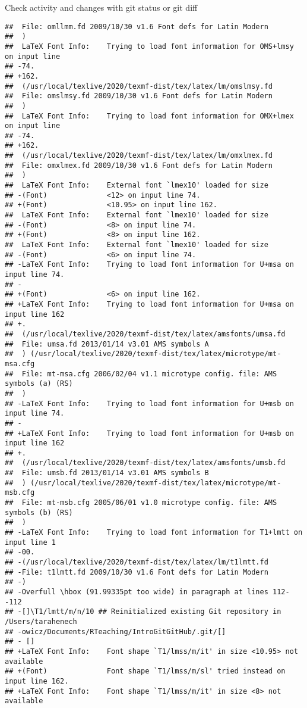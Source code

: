 \documentclass[ignorenonframetext,]{beamer}
\begin{document}
\begin{frame}[fragile]{Check activity and changes with git status or git
diff}
\begin{verbatim}
##  File: omllmm.fd 2009/10/30 v1.6 Font defs for Latin Modern
##  )
##  LaTeX Font Info:    Trying to load font information for OMS+lmsy on input line 
## -74.
## +162.
##  (/usr/local/texlive/2020/texmf-dist/tex/latex/lm/omslmsy.fd
##  File: omslmsy.fd 2009/10/30 v1.6 Font defs for Latin Modern
##  )
##  LaTeX Font Info:    Trying to load font information for OMX+lmex on input line 
## -74.
## +162.
##  (/usr/local/texlive/2020/texmf-dist/tex/latex/lm/omxlmex.fd
##  File: omxlmex.fd 2009/10/30 v1.6 Font defs for Latin Modern
##  )
##  LaTeX Font Info:    External font `lmex10' loaded for size
## -(Font)              <12> on input line 74.
## +(Font)              <10.95> on input line 162.
##  LaTeX Font Info:    External font `lmex10' loaded for size
## -(Font)              <8> on input line 74.
## +(Font)              <8> on input line 162.
##  LaTeX Font Info:    External font `lmex10' loaded for size
## -(Font)              <6> on input line 74.
## -LaTeX Font Info:    Trying to load font information for U+msa on input line 74.
## -
## +(Font)              <6> on input line 162.
## +LaTeX Font Info:    Trying to load font information for U+msa on input line 162
## +.
##  (/usr/local/texlive/2020/texmf-dist/tex/latex/amsfonts/umsa.fd
##  File: umsa.fd 2013/01/14 v3.01 AMS symbols A
##  ) (/usr/local/texlive/2020/texmf-dist/tex/latex/microtype/mt-msa.cfg
##  File: mt-msa.cfg 2006/02/04 v1.1 microtype config. file: AMS symbols (a) (RS)
##  )
## -LaTeX Font Info:    Trying to load font information for U+msb on input line 74.
## -
## +LaTeX Font Info:    Trying to load font information for U+msb on input line 162
## +.
##  (/usr/local/texlive/2020/texmf-dist/tex/latex/amsfonts/umsb.fd
##  File: umsb.fd 2013/01/14 v3.01 AMS symbols B
##  ) (/usr/local/texlive/2020/texmf-dist/tex/latex/microtype/mt-msb.cfg
##  File: mt-msb.cfg 2005/06/01 v1.0 microtype config. file: AMS symbols (b) (RS)
##  )
## -LaTeX Font Info:    Trying to load font information for T1+lmtt on input line 1
## -00.
## -(/usr/local/texlive/2020/texmf-dist/tex/latex/lm/t1lmtt.fd
## -File: t1lmtt.fd 2009/10/30 v1.6 Font defs for Latin Modern
## -)
## -Overfull \hbox (91.99335pt too wide) in paragraph at lines 112--112
## -[]\T1/lmtt/m/n/10 ## Reinitialized existing Git repository in /Users/tarahenech
## -owicz/Documents/RTeaching/IntroGitGitHub/.git/[] 
## - []
## +LaTeX Font Info:    Font shape `T1/lmss/m/it' in size <10.95> not available
## +(Font)              Font shape `T1/lmss/m/sl' tried instead on input line 162.
## +LaTeX Font Info:    Font shape `T1/lmss/m/it' in size <8> not available

\end{verbatim}
\end{frame}
\end{document}
